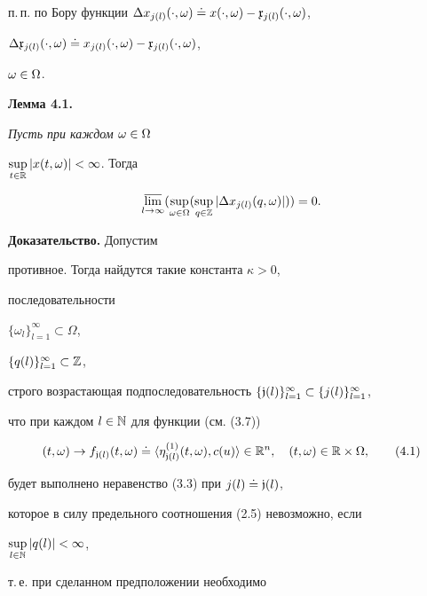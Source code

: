 п.\,п. по Бору функции $\Delta x_{j(l)}(\cdot,\omega)\doteq


x(\cdot,\omega)-\frak x_{j(l)}(\cdot,\omega)$,


$\Delta \frak x_{j(l)}(\cdot,\omega)\doteq


x_{j(l)}(\cdot,\omega)-\frak x_{j(l)}(\cdot,\omega)$,


$\omega\in\Omega$.


\medskip





{\bf Лемма 4.1.} {\it Пусть при каждом $\omega\in\Omega$\;


$\sup\limits_{t\in\Bbb R}|x(t,\omega)|<\infty$. Тогда}


$$


\underset{l\to\infty}{\varlimsup}


(\sup\limits_{\mm}(\sup\limits_{q\in\Bbb Z}|


\Delta x_{j(l)}(q,\omega)|))=0.


$$





{\bf Доказательство.} Допустим


противное. Тогда найдутся такие константа $\kappa>0$,


последовательности


$\{\omega_l\}_{l=1}^{\infty}\subset\Omega$,


$\{q(l)\}_{l=1}^{\infty}\subset\Bbb Z$,


строго возрастающая подпоследовательность $\{\gj


(l)\}_{l=1}^{\infty}\subset\{j(l)\}_{l=1}^{\infty}$,


что при каждом $l\in\Bbb N$ для функции (см. (3.7))


\begin{equation}


\tm\to


f_{\gj(l)}\tm\doteq \la


\eta_{\gj(l)}^{(1)}\tm,c(u)\ra\in \Bbb R^n,\quad


\tm\in\Bbb R\times\Omega, \tag{4.1}


\end{equation}


будет выполнено неравенство (3.3) при $j(l)\doteq \frak j(l)$,


которое в силу предельного соотношения (2.5) невозможно, если


$\sup\limits_{l\in\Bbb N}|q(l)|<\infty$,


т.\,е. при сделанном предположении необходимо


